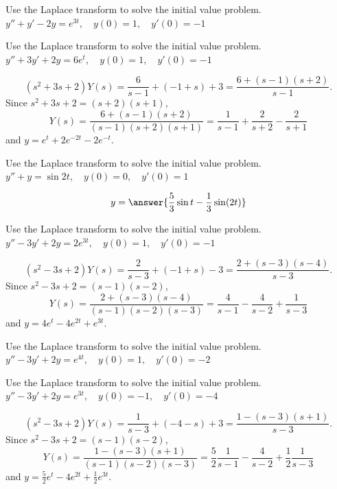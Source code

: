 \documentclass{ximera}
\begin{document}
\begin{problem}\label{exer:8.3.5} Use the Laplace transform to solve the initial value problem. $y''+y'-2y=e^{3t}, \quad  y(0)=1,\quad y'(0)=-1$
\end{problem}

\begin{problem}\label{exer:8.3.6} Use the Laplace transform to solve the initial value problem. $y''+3y'+2y=6e^t, \quad  y(0)=1,\quad y'(0)=-1$

\begin{solution}
$$
(s^2+3s+2)Y(s)=\frac{6}{s-1}+(-1+s)+3=\frac{6+(s-1)(s+2)}{s-1}.
$$
Since $s^2+3s+2=(s+2)(s+1)$,
$$
Y(s)=\frac{6+(s-1)(s+2)}{(s-1)(s+2)(s+1)}=
\frac{1}{s-1}+\frac{2}{s+2}-\frac{2}{s+1}
$$
and
 $y=e^t+2e^{-2t}-2e^{-t}$.
\end{solution}
\end{problem}

\begin{problem}\label{exer:8.3.7} Use the Laplace transform to solve the initial value problem. $y''+y=\sin2t, \quad  y(0)=0,\quad y'(0)=1$

$$y=\answer{\frac{5}{3}\sin{t}-\frac{1}{3}\sin(2t)}$$

\end{problem}

\begin{problem}\label{exer:8.3.8} Use the Laplace transform to solve the initial value problem. $y''-3y'+2y=2e^{3t}, \quad  y(0)=1,\quad y'(0)=-1$

\begin{solution}
$$
 (s^2-3s+2)Y(s)=\frac{2}{s-3}+(-1+s)-3=\frac{2+(s-3)(s-4)}{s-3}.
$$
Since $s^2-3s+2=(s-1)(s-2)$,
$$
Y(s)=\frac{2+(s-3)(s-4)}{(s-1)(s-2)(s-3)}=
\frac{4}{s-1}-\frac{4}{s-2}+\frac{1}{s-3}
$$
and
  $y=4e^t-4e^{2t}+e^{3t}$.
\end{solution}
\end{problem}

\begin{problem}\label{exer:8.3.9} Use the Laplace transform to solve the initial value problem. $y''-3y'+2y=e^{4t}, \quad  y(0)=1,\quad y'(0)=-2$
\end{problem}

\begin{problem}\label{exer:8.3.10} Use the Laplace transform to solve the initial value problem. $y''-3y'+2y=e^{3t}, \quad  y(0)=-1,\quad y'(0)=-4$

\begin{solution}
$$
(s^2-3s+2)Y(s)=\frac{1}{s-3}+(-4-s)+3=\frac{1-(s-3)(s+1)}{s-3}.
$$
Since $s^2-3s+2=(s-1)(s-2)$,
$$
Y(s)=\frac{1-(s-3)(s+1)}{(s-1)(s-2)(s-3)}=
\frac{5}{2}\frac{1}{s-1}-\frac{4}{s-2}+\frac{1}{2}\frac{1}{s-3}
$$
and
  $y=\frac{5}{2}e^t-4e^{2t}+\frac{1}{2}e^{3t}$.
\end{solution}
\end{problem}
\end{document}
